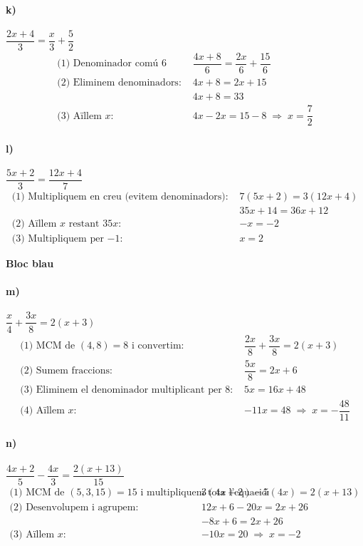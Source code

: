 \documentclass[11pt,a4paper]{article}
\begin{document}
\paragraph{k)} $\dfrac{2x + 4}{3} = \dfrac{x}{3} + \dfrac{5}{2}$
\[
\begin{aligned}
\text{(1) Denominador comú 6 } & \dfrac{4x + 8}{6} = \dfrac{2x}{6} + \dfrac{15}{6} \\
\text{(2) Eliminem denominadors: } & 4x + 8 = 2x + 15 \\
& 4x + 8 = 33 \\
\text{(3) Aïllem } x: & 4x - 2x= 15 - 8 \;\Rightarrow\; \boxed{x = \dfrac{7}{2}}
\end{aligned}
\]

\paragraph{l)} $\dfrac{5x + 2}{3} = \dfrac{12x + 4}{7}$
\[
\begin{aligned}
\text{(1) Multipliquem en creu (evitem denominadors): } & 7(5x + 2) = 3(12x + 4) \\
& 35x + 14 = 36x + 12 \\
\text{(2) Aïllem } x \text{ restant } 35x: & -x = -2 \\
\text{(3) Multipliquem per $-1$: } & \boxed{x = 2}
\end{aligned}
\]

\textbf{Bloc blau}

\paragraph{m)} $\dfrac{x}{4} + \dfrac{3x}{8} = 2(x + 3)$
\[
\begin{aligned}
\text{(1) MCM de }(4,8)=8 \text{ i convertim: } & \dfrac{2x}{8} + \dfrac{3x}{8} = 2(x + 3) \\
\text{(2) Sumem fraccions: } & \dfrac{5x}{8} = 2x + 6 \\
\text{(3) Eliminem el denominador multiplicant per 8: } & 5x = 16x + 48 \\
\text{(4) Aïllem } x: & -11x = 48 \;\Rightarrow\; \boxed{x = -\dfrac{48}{11}}
\end{aligned}
\]

\paragraph{n)} $\dfrac{4x + 2}{5} - \dfrac{4x}{3} = \dfrac{2(x + 13)}{15}$
\[
\begin{aligned}
\text{(1) MCM de }(5,3,15)=15 \text{ i multipliquem tota l'equació: } &
3(4x + 2) - 5(4x) = 2(x + 13) \\
\text{(2) Desenvolupem i agrupem: } & 12x + 6 - 20x = 2x + 26 \\
& -8x + 6 = 2x + 26 \\
\text{(3) Aïllem } x: & -10x = 20 \;\Rightarrow\; \boxed{x = -2}
\end{aligned}
\]
\end{document}
